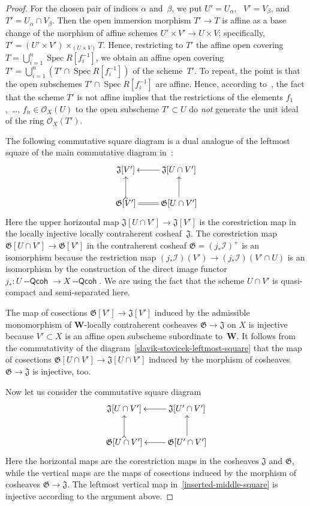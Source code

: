 \documentclass[12pt,a4paper]{amsart}
\newcommand{\+}{\nobreakdash-}
\renewcommand{\:}{\colon}
\newcommand{\rarrow}{\longrightarrow}
\DeclareMathOperator{\Spec}{Spec}
\newcommand{\Qcoh}{{\operatorname{\mathsf{--Qcoh}}}}
\newcommand{\bW}{\mathbf W}
\newcommand{\cO}{\mathcal O}
\newcommand{\cI}{\mathcal I}
\newcommand{\fG}{\mathfrak G}
\newcommand{\fJ}{\mathfrak J}
\theoremstyle{plain}
\theoremstyle{definition}
\begin{document}
\begin{proof}
 For the chosen pair of indices $\alpha$ and~$\beta$, we put
$U'=U_\alpha$, \ $V'=V_\beta$, and $T'=U_\alpha\cap V_\beta$.
 Then the open immersion morphism $T'\rarrow T$ is affine as
a base change of the morphism of affine schemes $U'\times V'
\rarrow U\times V$; specifically,
$T'=(U'\times V')\times_{(U\times V)}T$.
 Hence, restricting to $T'$ the affine open covering
$T=\bigcup_{i=1}^n\Spec R[f_i^{-1}]$, we obtain
an affine open covering $T'=\bigcup_{i=1}^n(T'\cap\Spec R[f_i^{-1}])$
of the scheme~$T'$.
 To repeat, the point is that the open subschemes
$T'\cap\Spec R[f_i^{-1}]$ are affine.
 Hence, according to~\cite[Chapter~II, Section~II.2,
Exercise~2.17(b)]{HarAG}, the fact that the scheme $T'$ is not affine
implies that the restrictions of the elements $f_1$,~\dots,
$f_n\in\cO_X(U)$ to the open subscheme $T'\subset U$ do \emph{not}
generate the unit ideal of the ring $\cO_X(T')$.

 The following commutative square diagram is a dual analogue
of the leftmost square of the main commutative diagram
in~\cite[proof of Theorem~2.2]{SS}:
\begin{equation} \label{slavik-stovicek-leftmost-square}
\begin{gathered}
 \xymatrix{
  \fJ[V'] & \fJ[U\cap V'] \ar[l] \\
  \fG[V'] \ar@{>->}[u] \ar@{=}[r] & \fG[U\cap V'] \ar[u]
 }
\end{gathered}
\end{equation}
 Here the upper horizontal map $\fJ[U\cap V']\rarrow\fJ[V']$
is the corestriction map in the locally injective locally
contraherent cosheaf~$\fJ$.
 The corestriction map $\fG[U\cap V']\rarrow\fG[V']$ in
the contraherent cosheaf $\fG=(j_*\cI)^+$ is an isomorphism because
the restriction map $(j_*\cI)(V')\rarrow(j_*\cI)(V'\cap U)$ is
an isomorphism by the construction of the direct image functor
$j_*\:U\Qcoh\rarrow X\Qcoh$.
 We are using the fact that the scheme $U\cap V'$ is quasi-compact
and semi-separated here.

 The map of cosections $\fG[V']\rarrow\fJ[V']$ induced by
the admissible monomorphism of $\bW$\+locally contraherent cosheaves
$\fG\rarrow\fJ$ on $X$ is injective because $V'\subset X$ is
an affine open subscheme subordinate to~$\bW$.
 It follows from the commutativity of
the diagram~\eqref{slavik-stovicek-leftmost-square} that the map of
cosections $\fG[U\cap V']\rarrow\fJ[U\cap V']$ induced by the morphism
of cosheaves $\fG\rarrow\fJ$ is injective, too.

 Now let us consider the commutative square diagram
\begin{equation} \label{inserted-middle-square}
\begin{gathered}
 \xymatrix{
  \fJ[U\cap V'] & \fJ[U'\cap V'] \ar[l] \\
  \fG[U\cap V'] \ar@{>->}[u] & \fG[U'\cap V'] \ar[l] \ar[u]
 }
\end{gathered}
\end{equation}
 Here the horizontal maps are the corestriction maps in the cosheaves
$\fJ$ and $\fG$, while the vertical maps are the maps of cosections
induced by the morphism of cosheaves $\fG\rarrow\fJ$.
 The leftmost vertical map in~\eqref{inserted-middle-square} is
injective according to the argument above.


\end{proof}
\end{document}
